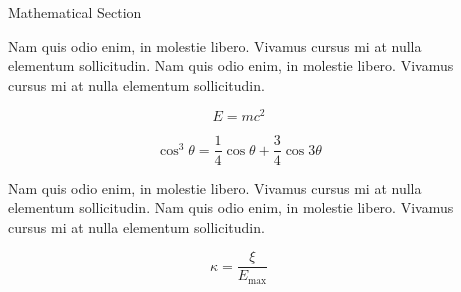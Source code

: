 \documentclass[final]{beamer}
\newlength{\sepwid}
\newlength{\onecolwid}
\newlength{\twocolwid}
\begin{document}
\begin{frame}
\begin{columns}[t]
\begin{column}{\twocolwid}

\begin{columns}[t,totalwidth=\twocolwid] %

\begin{column}{\onecolwid} %


\begin{exampleblock}{Mathematical Section}

Nam quis odio enim, in molestie libero. Vivamus cursus mi at nulla elementum sollicitudin. Nam quis odio enim, in molestie libero. Vivamus cursus mi at nulla elementum sollicitudin.
  
\begin{equation}
E = mc^{2}
\label{eqn:Einstein}
\end{equation}

\begin{equation}
\cos^3 \theta =\frac{1}{4}\cos\theta+\frac{3}{4}\cos 3\theta
\label{eqn:cosfunc}
\end{equation}

Nam quis odio enim, in molestie libero. Vivamus cursus mi at nulla elementum sollicitudin. Nam quis odio enim, in molestie libero. Vivamus cursus mi at nulla elementum sollicitudin.

\begin{equation}
\kappa =\frac{\xi}{E_{\mathrm{max}}} %
\label{eqn:kappa}
\end{equation}

\end{exampleblock}


\end{column} %
\begin{column}{\sepwid}\end{column} %

\begin{column}{\onecolwid} %



\end{column}
\end{columns}
\end{column}
\end{columns}
\end{frame}
\end{document}
